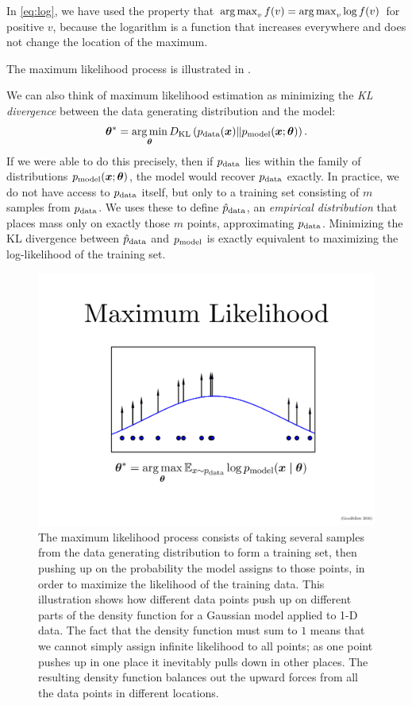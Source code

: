 In \eqref{eq:log}, we have used the property that $\operatorname*{arg\,max}_v f(v) = \operatorname*{arg\,max}_v \log f(v)$ for 
positive $v$, because the logarithm is a function that increases everywhere and does not change
the location of the maximum.

The maximum likelihood process is illustrated in .

We can also think of maximum likelihood estimation as minimizing the
{\em KL divergence} between the data generating distribution and the
model:
\[ {\bm{\theta}}^* = \operatorname*{arg\,min}_{\bm{\theta}} D_{\mathrm{KL}}\left( p_{\rm{data}}({\bm{x}}) \Vert p_{\rm{model}}({\bm{x}} ; {\bm{\theta}}) \right). \]
If we were able to do this precisely, then if $p_{\rm{data}}$ lies within the family of distributions
$p_{\rm{model}}({\bm{x}} ; {\bm{\theta}})$, the model would recover $p_{\rm{data}}$ exactly.
In practice, we do not have access to $p_{\rm{data}}$ itself, but only to a training set
consisting of $m$ samples from $p_{\rm{data}}$.
We uses these to define $\hat{p}_{\rm{data}}$, an {\em empirical distribution} that places mass only
on exactly those $m$ points, approximating $p_{\rm{data}}$.
Minimizing the KL divergence between $\hat{p}_{\rm{data}}$ and $p_{\rm{model}}$ is exactly equivalent to maximizing
the log-likelihood of the training set.

\begin{figure}
\centering
\includegraphics[width=\textwidth]{mle.pdf}
\caption{The maximum likelihood process consists of taking several samples from
  the data generating distribution to form a training set, then pushing up on the
  probability the model assigns to those points, in order to maximize the likelihood
  of the training data.
  This illustration shows how different data points push up on different parts of
  the density function for a Gaussian model applied to 1-D data.
  The fact that the density function must sum to $1$ means that we cannot simply
  assign infinite likelihood to all points; as one point pushes up in one place
  it inevitably pulls down in other places.
  The resulting density function balances out the upward forces from all the data
  points in different locations.
}
\label{fig:mle}
\end{figure}


